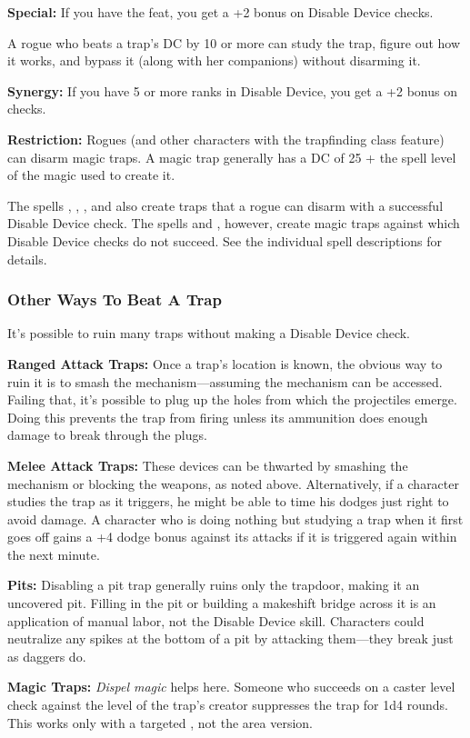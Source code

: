 \textbf{Special:} If you have the  feat, you get a +2 bonus on Disable Device checks.

A rogue who beats a trap's DC by 10 or more can study the trap, figure out how it works, and bypass it (along with her companions) without disarming it.

\textbf{Synergy:}  If you have 5 or more ranks in Disable Device, you get a +2 bonus on  checks.

\textbf{Restriction:} Rogues (and other characters with the trapfinding class feature) can disarm magic traps. A magic trap generally has a DC of 25 + the spell level of the magic used to create it.

The spells , , , and  also create traps that a rogue can disarm with a successful Disable Device check. The spells  and , however, create magic traps against which Disable Device checks do not succeed. See the individual spell descriptions for details.

\subsubsection{Other Ways To Beat A Trap}
It's possible to ruin many traps without making a Disable Device check.

\textbf{Ranged Attack Traps:} Once a trap's location is known, the obvious way to ruin it is to smash the mechanism---assuming the mechanism can be accessed. Failing that, it's possible to plug up the holes from which the projectiles emerge. Doing this prevents the trap from firing unless its ammunition does enough damage to break through the plugs.

\textbf{Melee Attack Traps:} These devices can be thwarted by smashing the mechanism or blocking the weapons, as noted above. Alternatively, if a character studies the trap as it triggers, he might be able to time his dodges just right to avoid damage. A character who is doing nothing but studying a trap when it first goes off gains a +4 dodge bonus against its attacks if it is triggered again within the next minute.

\textbf{Pits:} Disabling a pit trap generally ruins only the trapdoor, making it an uncovered pit. Filling in the pit or building a makeshift bridge across it is an application of manual labor, not the Disable Device skill. Characters could neutralize any spikes at the bottom of a pit by attacking them---they break just as daggers do.

\textbf{Magic Traps:} \emph{Dispel magic} helps here. Someone who succeeds on a caster level check against the level of the trap's creator suppresses the trap for 1d4 rounds. This works only with a targeted , not the area version.